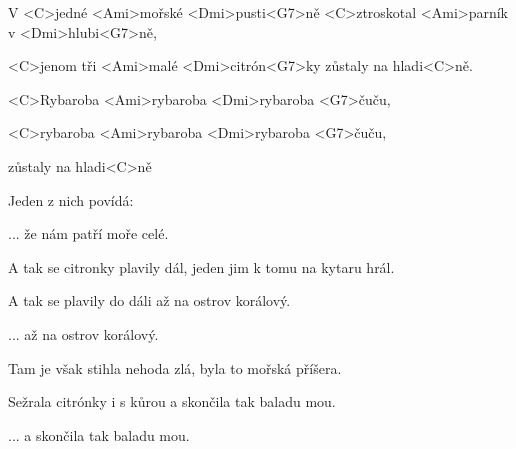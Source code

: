 

\zs
V <C>jedné <Ami>mořské <Dmi>pusti<G7>ně
<C>ztroskotal <Ami>parník v <Dmi>hlubi<G7>ně,

<C>jenom tři <Ami>malé <Dmi>citrón<G7>ky
zůstaly na hladi<C>ně.
\ks

\zr
<C>Rybaroba <Ami>rybaroba <Dmi>rybaroba <G7>čuču,

<C>rybaroba <Ami>rybaroba <Dmi>rybaroba <G7>čuču,

zůstaly na hladi<C>ně
\kr

\zs
Jeden z nich povídá: 
\ks

\zr ... že nám patří moře celé. \kr

\zs
A tak se citronky plavily dál, jeden jim k tomu na kytaru hrál.

A tak se plavily do dáli až na ostrov korálový.
\ks

\zr ... až na ostrov korálový. \kr

\zs
Tam je však stihla nehoda zlá, byla to mořská příšera.

Sežrala citrónky i s kůrou a skončila tak baladu mou.
\ks

\zr ... a skončila tak baladu mou. \kr

\kp
